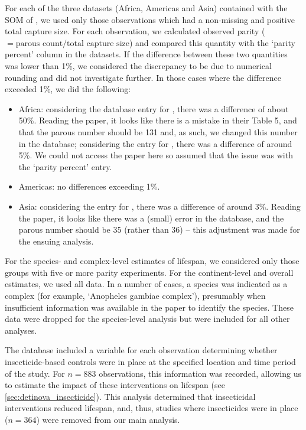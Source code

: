 \documentclass[12pt]{article}
\begin{document}
{For each of the three datasets (Africa, Americas and Asia) contained with the SOM of \cite{massey2016global}, we used only those observations which had a non-missing and positive total capture size. For each observation, we calculated observed parity ($=\text{parous count}/ \text{total capture size}$) and compared this quantity with the `parity percent' column in the datasets. If the difference between these two quantities was lower than 1\%, we considered the discrepancy to be due to numerical rounding and did not investigate further. In those cases where the difference exceeded 1\%, we did the following:

\begin{itemize}
	\item Africa: considering the database entry for \cite{ijumba2002malaria}, there was a difference of about 50\%. Reading the paper, it looks like there is a mistake in their Table 5, and that the parous number should be 131 and, as such, we changed this number in the database; considering the entry for \cite{bockarie46service}, there was a difference of around 5\%. We could not access the paper here so assumed that the issue was with the `parity percent' entry.
	\item Americas: no differences exceeding 1\%.
	\item Asia: considering the entry for \cite{kitthawee1992relationship}, there was a difference of around 3\%. Reading the paper, it looks like there was a (small) error in the database, and the parous number should be 35 (rather than 36) -- this adjustment was made for the ensuing analysis.
\end{itemize}

For the species- and complex-level estimates of lifespan, we considered only those groups with five or more parity experiments. For the continent-level and overall estimates, we used all data. In a number of cases, a species was indicated as a complex (for example, `Anopheles gambiae complex'), presumably when insufficient information was available in the paper to identify the species. These data were dropped for the species-level analysis but were included for all other analyses.


The \cite{massey2016global} database included a variable for each observation determining whether insecticide-based controls were in place at the specified location and time period of the study. For $n=883$ observations, this information was recorded, allowing us to estimate the impact of these interventions on lifespan (see \ref{sec:detinova_insecticide}). This analysis determined that insecticidal interventions reduced lifespan, and, thus, studies where insecticides were in place ($n=364$) were removed from our main analysis.


}
\end{document}
